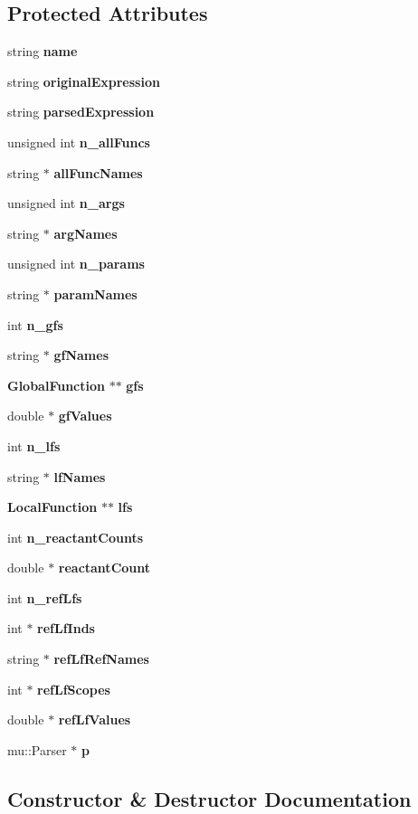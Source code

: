 \subsection*{Protected Attributes}
\begin{CompactItemize}
\item 
string {\bf name}
\item 
string {\bf originalExpression}
\item 
string {\bf parsedExpression}
\item 
unsigned int {\bf n\_\-allFuncs}
\item 
string $\ast$ {\bf allFuncNames}
\item 
unsigned int {\bf n\_\-args}
\item 
string $\ast$ {\bf argNames}
\item 
unsigned int {\bf n\_\-params}
\item 
string $\ast$ {\bf paramNames}
\item 
int {\bf n\_\-gfs}
\item 
string $\ast$ {\bf gfNames}
\item 
{\bf GlobalFunction} $\ast$$\ast$ {\bf gfs}
\item 
double $\ast$ {\bf gfValues}
\item 
int {\bf n\_\-lfs}
\item 
string $\ast$ {\bf lfNames}
\item 
{\bf LocalFunction} $\ast$$\ast$ {\bf lfs}
\item 
int {\bf n\_\-reactantCounts}
\item 
double $\ast$ {\bf reactantCount}
\item 
int {\bf n\_\-refLfs}
\item 
int $\ast$ {\bf refLfInds}
\item 
string $\ast$ {\bf refLfRefNames}
\item 
int $\ast$ {\bf refLfScopes}
\item 
double $\ast$ {\bf refLfValues}
\item 
mu::Parser $\ast$ {\bf p}
\end{CompactItemize}


\subsection{Constructor \& Destructor Documentation}
